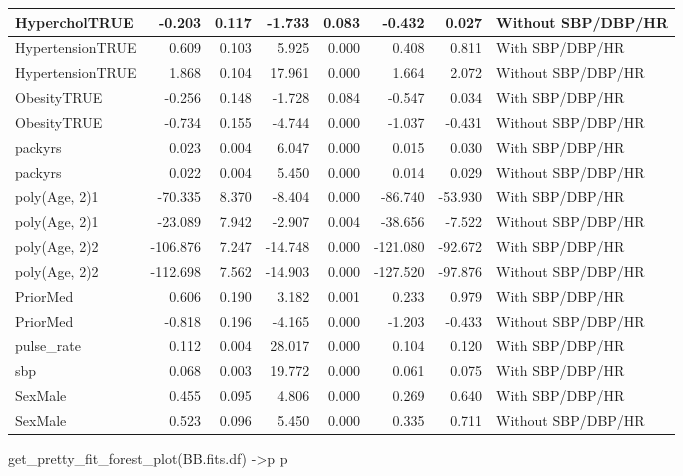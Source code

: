 \documentclass[
]{article}
\newenvironment{Shaded}{\begin{snugshade}}{\end{snugshade}}
\newcommand{\FunctionTok}[1]{\textcolor[rgb]{0.00,0.00,0.00}{#1}}
\newcommand{\NormalTok}[1]{#1}
\newcommand{\OtherTok}[1]{\textcolor[rgb]{0.56,0.35,0.01}{#1}}
\begin{document}
\begin{table}
\begin{tabular}[t]{l|r|r|r|r|r|r|l}
\hline
HypercholTRUE & -0.203 & 0.117 & -1.733 & 0.083 & -0.432 & 0.027 & Without SBP/DBP/HR\\
\hline
HypertensionTRUE & 0.609 & 0.103 & 5.925 & 0.000 & 0.408 & 0.811 & With SBP/DBP/HR\\
\hline
HypertensionTRUE & 1.868 & 0.104 & 17.961 & 0.000 & 1.664 & 2.072 & Without SBP/DBP/HR\\
\hline
ObesityTRUE & -0.256 & 0.148 & -1.728 & 0.084 & -0.547 & 0.034 & With SBP/DBP/HR\\
\hline
ObesityTRUE & -0.734 & 0.155 & -4.744 & 0.000 & -1.037 & -0.431 & Without SBP/DBP/HR\\
\hline
packyrs & 0.023 & 0.004 & 6.047 & 0.000 & 0.015 & 0.030 & With SBP/DBP/HR\\
\hline
packyrs & 0.022 & 0.004 & 5.450 & 0.000 & 0.014 & 0.029 & Without SBP/DBP/HR\\
\hline
poly(Age, 2)1 & -70.335 & 8.370 & -8.404 & 0.000 & -86.740 & -53.930 & With SBP/DBP/HR\\
\hline
poly(Age, 2)1 & -23.089 & 7.942 & -2.907 & 0.004 & -38.656 & -7.522 & Without SBP/DBP/HR\\
\hline
poly(Age, 2)2 & -106.876 & 7.247 & -14.748 & 0.000 & -121.080 & -92.672 & With SBP/DBP/HR\\
\hline
poly(Age, 2)2 & -112.698 & 7.562 & -14.903 & 0.000 & -127.520 & -97.876 & Without SBP/DBP/HR\\
\hline
PriorMed & 0.606 & 0.190 & 3.182 & 0.001 & 0.233 & 0.979 & With SBP/DBP/HR\\
\hline
PriorMed & -0.818 & 0.196 & -4.165 & 0.000 & -1.203 & -0.433 & Without SBP/DBP/HR\\
\hline
pulse\_rate & 0.112 & 0.004 & 28.017 & 0.000 & 0.104 & 0.120 & With SBP/DBP/HR\\
\hline
sbp & 0.068 & 0.003 & 19.772 & 0.000 & 0.061 & 0.075 & With SBP/DBP/HR\\
\hline
SexMale & 0.455 & 0.095 & 4.806 & 0.000 & 0.269 & 0.640 & With SBP/DBP/HR\\
\hline
SexMale & 0.523 & 0.096 & 5.450 & 0.000 & 0.335 & 0.711 & Without SBP/DBP/HR\\
\hline
\end{tabular}
\end{table}

\begin{Shaded}
\begin{Highlighting}[]
\FunctionTok{get\_pretty\_fit\_forest\_plot}\NormalTok{(BB.fits.df) }\OtherTok{{-}\textgreater{}}\NormalTok{p}
\NormalTok{p}
\end{Highlighting}
\end{Shaded}
\end{document}
